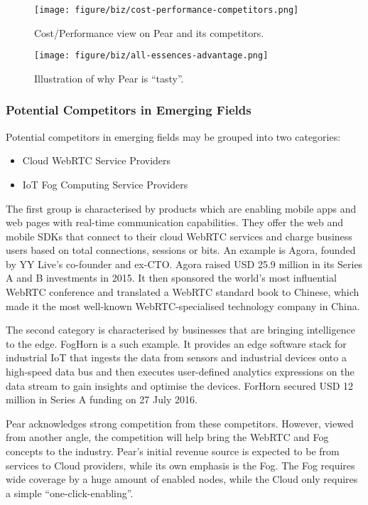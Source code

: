 \begin{figure}[ht]
	\centering
	\texttt{[image: figure/biz/cost-performance-competitors.png]}
	\caption{Cost/Performance view on Pear and its competitors.} \label{fig:cost-performance-competitors}
\end{figure}

\begin{figure}[htb]
	\centering
	\texttt{[image: figure/biz/all-essences-advantage.png]}
	\caption{Illustration of why Pear is ``tasty''.} \label{fig:all-essences-advantage}
\end{figure}

\subsubsection{Potential Competitors in Emerging Fields}
Potential competitors in emerging fields may be grouped into two categories: 
\begin{itemize}
	\item Cloud WebRTC Service Providers 
	\item IoT Fog Computing Service Providers
\end{itemize} 

The first group is characterised by products which are enabling mobile apps and web pages with real-time communication capabilities. They offer the web and mobile SDKs that connect to their cloud WebRTC services and charge business users based on total connections, sessions or bits. An example is Agora, founded by YY Live's co-founder and ex-CTO. Agora raised USD 25.9 million in its Series A and B investments in 2015. It then sponsored the world's most influential WebRTC conference and translated a WebRTC standard book to Chinese, which made it the most well-known WebRTC-specialised technology company in China. 

The second category is characterised by businesses that are bringing intelligence to the edge. FogHorn is a such example. It provides an edge software stack for industrial IoT that ingests the data from sensors and industrial devices onto a high-speed data bus and then executes user-defined analytics expressions on the data stream to gain insights and optimise the devices. ForHorn secured USD 12 million in Series A funding on 27 July 2016. 

Pear acknowledges strong competition from these competitors. However, viewed from another angle, the competition will help bring the WebRTC and Fog concepts to the industry. Pear's initial revenue source is expected to be from services to Cloud providers, while its own emphasis is the Fog. The Fog requires wide coverage by a huge amount of enabled nodes, while the Cloud only requires a simple ``one-click-enabling''. 

